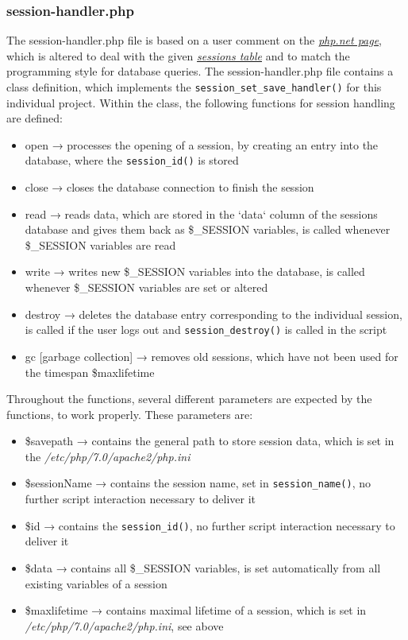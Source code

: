 \subsubsection{session-handler.php}\label{session-handler}
The session-handler.php file is based on a user comment on the \href{https://secure.php.net/manual/de/function.session-set-save-handler.php#118225}{\textit{php.net page}}, 
which is altered to deal with the given \hyperref[sessions_database]{\textit{sessions table}} and to match the programming style for database queries. The session-handler.php file 
contains a class definition, which implements the \texttt{session\_set\_save\_handler()} for this individual project. Within the class, the following functions for session handling 
are defined:
\begin{itemize}
\item open → processes the opening of a session, by creating an entry into the database, where the \texttt{session\_id()} is stored
\item close → closes the database connection to finish the session
\item read → reads data, which are stored in the `data` column of the sessions database and gives them back as \$\_SESSION variables, is called whenever \$\_SESSION variables are read
\item write → writes new \$\_SESSION variables into the database, is called whenever \$\_SESSION variables are set or altered
\item destroy → deletes the database entry corresponding to the individual session, is called if the user logs out and \texttt{session\_destroy()} is called in the script
\item gc [garbage collection] → removes old sessions, which have not been used for the timespan \$maxlifetime
\end{itemize}
Throughout the functions, several different parameters are expected by the functions, to work properly. These parameters are:
\begin{itemize}
 \item \$savepath → contains the general path to store session data, which is set in the \emph{/etc/php/7.0/apache2/php.ini}
 \item \$sessionName → contains the session name, set in \texttt{session\_name()}, no further script interaction necessary to deliver it
 \item \$id → contains the \texttt{session\_id()}, no further script interaction necessary to deliver it
 \item \$data → contains all \$\_SESSION variables, is set automatically from all existing variables of a session
 \item \$maxlifetime → contains maximal lifetime of a session, which is set in \emph{/etc/php/7.0/apache2/php.ini}, see above
\end{itemize}
